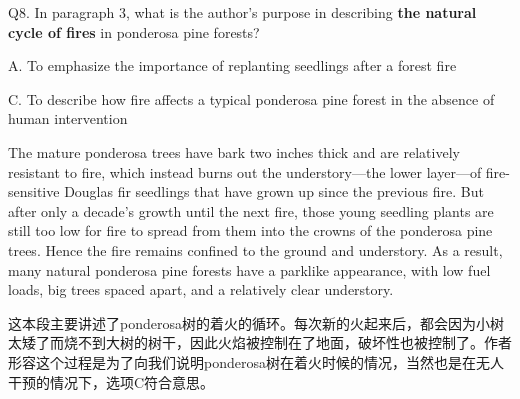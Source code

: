 \begin{blk}
    \begin{qst}
        Q8. In paragraph 3, what is the author’s purpose in describing \textbf{the natural cycle of fires} in ponderosa pine forests?
    \end{qst}

    \begin{chc}
        A. To emphasize the importance of replanting seedlings after a forest fire

        C. To describe how fire affects a typical ponderosa pine forest in the absence of human intervention
    \end{chc}

    \begin{psgq}
        The mature ponderosa trees have bark two inches thick and are relatively resistant to fire, which instead burns out the understory—the lower layer—of fire-sensitive Douglas fir seedlings that have grown up since the previous fire. But after only a decade’s growth until the next fire, those young seedling plants are still too low for fire to spread from them into the crowns of the ponderosa pine trees. Hence the fire remains confined to the ground and understory. As a result, many natural ponderosa pine forests have a parklike appearance, with low fuel loads, big trees spaced apart, and a relatively clear understory.
    \end{psgq}

    \begin{nlz}
        这本段主要讲述了ponderosa树的着火的循环。每次新的火起来后，都会因为小树太矮了而烧不到大树的树干，因此火焰被控制在了地面，破坏性也被控制了。作者形容这个过程是为了向我们说明ponderosa树在着火时候的情况，当然也是在无人干预的情况下，选项C符合意思。
    \end{nlz}
\end{blk}
